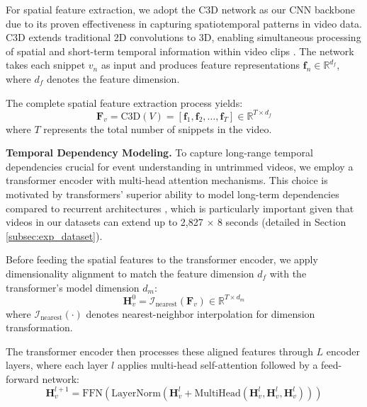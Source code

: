 For spatial feature extraction, we adopt the C3D network \cite{Tran2015-uq} as our CNN backbone due to its proven effectiveness in capturing spatiotemporal patterns in video data. C3D extends traditional 2D convolutions to 3D, enabling simultaneous processing of spatial and short-term temporal information within video clips \cite{Karpathy2014-xm}. The network takes each snippet $v_n$ as input and produces feature representations $\mathbf{f}_n \in \mathbb{R}^{d_f}$, where $d_f$ denotes the feature dimension.

The complete spatial feature extraction process yields:
\begin{equation}
  \mathbf{F}_v = \text{C3D}(V) = [\mathbf{f}_1, \mathbf{f}_2, \ldots, \mathbf{f}_T] \in \mathbb{R}^{T \times d_f}
  \label{eq:spatial_features}
\end{equation}
where $T$ represents the total number of snippets in the video.

\textbf{Temporal Dependency Modeling.}
To capture long-range temporal dependencies crucial for event understanding in untrimmed videos, we employ a transformer encoder \cite{Vaswani2017-sc} with multi-head attention mechanisms. This choice is motivated by transformers' superior ability to model long-term dependencies compared to recurrent architectures \cite{Vaswani2017-sc}, which is particularly important given that videos in our datasets can extend up to 2,827 $\times$ 8 seconds (detailed in Section \ref{subsec:exp_dataset}).

Before feeding the spatial features to the transformer encoder, we apply dimensionality alignment to match the feature dimension $d_f$ with the transformer's model dimension $d_m$:
\begin{equation}
  \mathbf{H}_v^0 = \mathcal{I}_{\text{nearest}} \left( \mathbf{F}_v \right) \in \mathbb{R}^{T \times d_m}
  \label{eq:dimension_alignment}
\end{equation}
where $\mathcal{I}_{\text{nearest}}(\cdot)$ denotes nearest-neighbor interpolation for dimension transformation.

The transformer encoder then processes these aligned features through $L$ encoder layers, where each layer $l$ applies multi-head self-attention followed by a feed-forward network:
\begin{equation}
  \mathbf{H}_v^{l+1} = \text{FFN}\left(\text{LayerNorm} \left(\mathbf{H}_v^l + \text{MultiHead}\left( \mathbf{H}_v^l, \mathbf{H}_v^l, \mathbf{H}_v^l \right) \right)\right)
  \label{eq:transformer_layer}
\end{equation}

